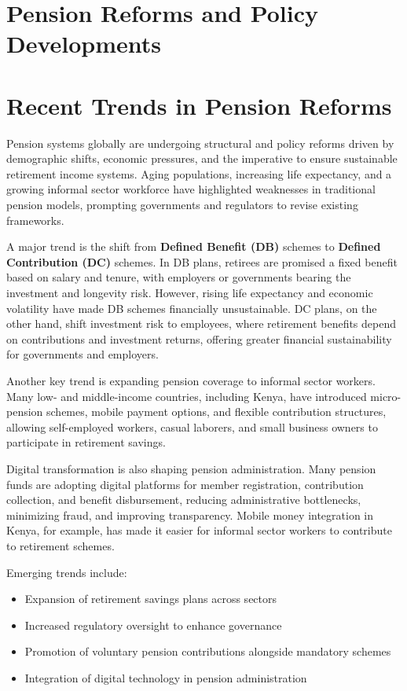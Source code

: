 \documentclass[12pt,a4paper]{article}
\begin{document}
\section*{Pension Reforms and Policy Developments}

\section{Recent Trends in Pension Reforms}

Pension systems globally are undergoing structural and policy reforms driven by demographic shifts, economic pressures, and the imperative to ensure sustainable retirement income systems. Aging populations, increasing life expectancy, and a growing informal sector workforce have highlighted weaknesses in traditional pension models, prompting governments and regulators to revise existing frameworks.

A major trend is the shift from \textbf{Defined Benefit (DB)} schemes to \textbf{Defined Contribution (DC)} schemes. In DB plans, retirees are promised a fixed benefit based on salary and tenure, with employers or governments bearing the investment and longevity risk. However, rising life expectancy and economic volatility have made DB schemes financially unsustainable. DC plans, on the other hand, shift investment risk to employees, where retirement benefits depend on contributions and investment returns, offering greater financial sustainability for governments and employers.

Another key trend is expanding pension coverage to informal sector workers. Many low- and middle-income countries, including Kenya, have introduced micro-pension schemes, mobile payment options, and flexible contribution structures, allowing self-employed workers, casual laborers, and small business owners to participate in retirement savings.

Digital transformation is also shaping pension administration. Many pension funds are adopting digital platforms for member registration, contribution collection, and benefit disbursement, reducing administrative bottlenecks, minimizing fraud, and improving transparency. Mobile money integration in Kenya, for example, has made it easier for informal sector workers to contribute to retirement schemes.

Emerging trends include:
\begin{itemize}
    \item Expansion of retirement savings plans across sectors
    \item Increased regulatory oversight to enhance governance
    \item Promotion of voluntary pension contributions alongside mandatory schemes
    \item Integration of digital technology in pension administration
\end{itemize}
\end{document}
